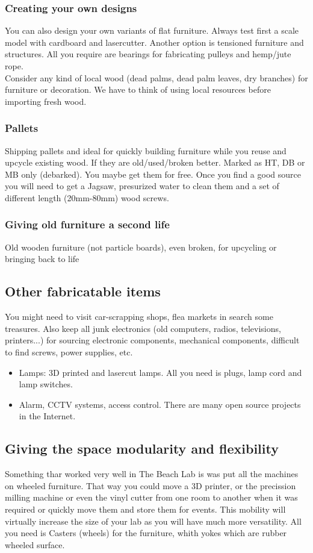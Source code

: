 \documentclass[a4paper,12pt,titlepage]{article}
\begin{document}
\subsubsection{Creating your own designs}
You can also design your own variants of flat furniture. Always test first a scale model with cardboard and lasercutter. Another option is tensioned furniture and structures. All you require are bearings for fabricating pulleys and hemp/jute rope.\\

Consider any kind of local wood (dead palms, dead palm leaves, dry branches) for furniture or decoration. We have to think of using local resources before importing fresh wood.

\subsubsection{Pallets}
Shipping pallets and ideal for quickly building furniture while you reuse and upcycle existing wood. If they are old/used/broken better. Marked as HT, DB or MB only (debarked). You maybe get them for free. Once you find a good source you will need to get a Jagsaw, presurized water to clean them and a set of different length (20mm-80mm) wood screws.

\subsubsection{Giving old furniture a second life}
Old wooden furniture (not particle boards), even broken, for upcycling or bringing back to life

\subsection{Other fabricatable items}
You might need to visit car-scrapping shops, flea markets in search some treasures. Also keep all junk electronics (old computers, radios, televisions, printers...) for sourcing electronic components, mechanical components, difficult to find screws, power supplies, etc.
\begin{itemize}
\item Lamps: 3D printed and lasercut lamps. All you need is plugs, lamp cord and lamp switches.
\item Alarm, CCTV systems, access control. There are many open source projects in the Internet.
\end{itemize}
\subsection{Giving the space modularity and flexibility}
Something thar worked very well in The Beach Lab is was put all the machines on wheeled furniture. That way you could move a 3D printer, or the precission milling machine or even the vinyl cutter from one room to another when it was required or quickly move them and store them for events. This mobility will virtually increase the size of your lab as you will have much more versatility. All you need is Casters (wheels) for the furniture, whith yokes which are rubber wheeled surface.\\
\end{document}
